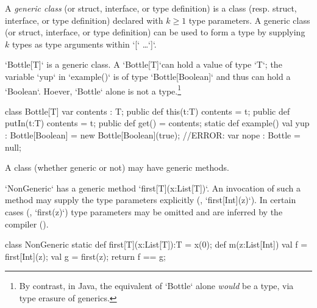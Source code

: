 A {\em generic class} (or struct, interface, or type definition) 
is a class (resp. struct, interface, or type definition) 
declared with $k \geq 1$ type parameters. 
A generic class (or struct, interface, or type definition) 
can be used to form a type by supplying $k$ types as type arguments within
\xcd`[` \ldots \xcd`]`.




\begin{ex}
\xcd`Bottle[T]` is a generic class.  A \xcd`Bottle[T]`can hold a value of type
\xcd`T`; the variable \xcd`yup` in \xcd`example()` 
is of type \xcd`Bottle[Boolean]` and thus 
can hold a \xcd`Boolean`.  Hoever, \xcd`Bottle` alone is not a
type.\footnote{By contrast, in Java, the equivalent of \xcd`Bottle` alone {\em
would} be a type, via type erasure of generics.}
\begin{xten}
class Bottle[T] {
  var contents : T;
  public def this(t:T) { contents = t;  }
  public def putIn(t:T) { contents = t; }
  public def get() = contents;
  static def example() {
    val yup : Bottle[Boolean] = new Bottle[Boolean](true);
    //ERROR: var nope : Bottle = null;
  }
}
\end{xten}

\end{ex}



A class (whether generic or not) may have generic methods.

\begin{ex}
\xcd`NonGeneric` has a generic method 
\xcd`first[T](x:List[T])`. An invocation of such a method may supply
the type parameters explicitly (\eg, \xcd`first[Int](z)`).
 In certain cases (\eg, \xcd`first(z)`)
type parameters may
be omitted and are inferred by the compiler ().

\begin{xten}
class NonGeneric {
  static def first[T](x:List[T]):T = x(0);
  def m(z:List[Int]) {
    val f = first[Int](z);
    val g = first(z);
    return f == g;
  }
}
\end{xten}
%


\end{ex}



